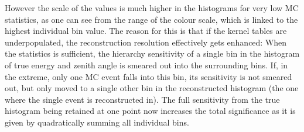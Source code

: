 However the scale of the \delchi values is much higher in the histograms for
very low MC statistics, as one can see from the range of the colour scale,
which is linked to the highest individual bin value. 
The reason for this is that if the kernel tables are underpopulated, the 
reconstruction resolution effectively gets enhanced: When the statistics is 
sufficient, the hierarchy sensitivity of a single bin in the histogram of true 
energy and zenith angle is smeared out into the surrounding bins. If, in the 
extreme, only one MC event falls into this bin, its sensitivity is not smeared 
out, but only moved to a single other bin in the reconstructed histogram (the 
one where the single event is reconstructed in). The full sensitivity from 
the true histogram being retained at one point now increases the total 
significance as it is given by quadratically summing all individual 
bins.



